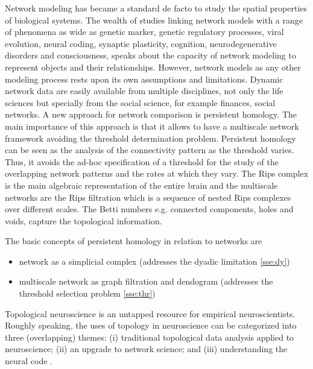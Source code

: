\documentclass[onecollarge,runningheads]{svjour2}
\begin{document}
Network modeling has became a standard de facto to study the spatial properties of biological systems. The wealth of studies linking network models with a range of phenomena as wide as genetic marker, genetic regulatory processes, viral evolution, neural coding, synaptic plasticity, cognition, neurodegenerative disorders and consciousness, speaks about the capacity of network modeling to represent objects and their relationships. However, network models as any other modeling process rests upon its own assumptions and limitations.
Dynamic network data are easily available from multiple disciplines, not only the life sciences but specially from the social science, for example finances, social networks. A new approach for network comparison is persistent homology. The main importance of this approach is that it allows to have a multiscale network framework avoiding the threshold determination problem. Persistent homology can be seen as the analysis of the connectivity pattern as the threshold varies. Thus, it avoids the ad-hoc specification of a threshold for the study of the overlapping network patterns and the rates at which they vary.
The Rips complex is the main algebraic representation of the entire brain and the multiscale networks are the Rips filtration which is a sequence of nested Rips complexes over different scales. The Betti numbers e.g. connected components, holes and voids, capture the topological information.

The basic concepts of persistent homology in relation to networks are
\begin{itemize}
\item network as a simplicial complex (addresses the dyadic limitation \ref{sse:dy})
\item multiscale network as graph filtration and dendogram (addresses the threshold selection problem \ref{sse:thr})
\end{itemize}

Topological neuroscience is an untapped resource for empirical neuroscientists.
Roughly speaking, the uses of topology in neuroscience can be categorized into three (overlapping) themes: (i) traditional topological data analysis applied to neuroscience; (ii) an upgrade to network science; and (iii) understanding the neural code \cite{curto2016can}.
\end{document}
